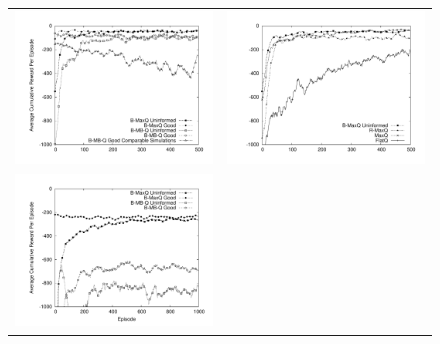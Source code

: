 \renewcommand{\arraystretch}{0}
\begin{figure}[ht]
\centering
\begin{tabular}{cc}
\includegraphics[trim=50 50 30 50, clip, scale=0.25]{exp/Taxib.pdf} & 
\includegraphics[trim=50 50 30 50, clip, scale=0.25]{exp/Taxinb.pdf} \\
\includegraphics[trim=50 50 30 50, clip, scale=0.25]{exp/Wargus3322b.pdf} & 

\end{tabular}
\end{figure}
